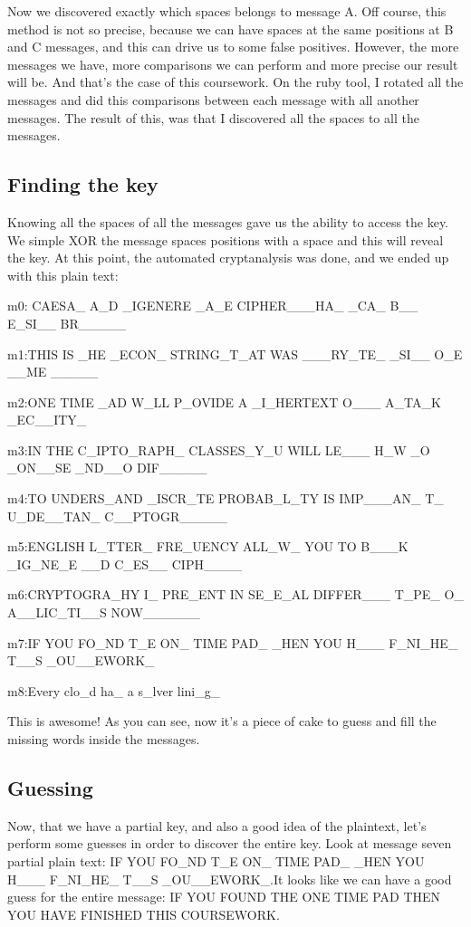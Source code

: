 \documentclass[journal]{IEEEtran}
\begin{document}
Now we discovered exactly which spaces belongs to message A. Off course, this method is not so precise, because we can have spaces at the same positions at B and C messages, and this can drive us to some false positives. However, the more messages we have, more comparisons we can perform and more precise our result will be. And that’s the case of this coursework. On the ruby tool, I rotated all the messages and did this comparisons between each message with all another messages. The result of this, was that I discovered all the spaces to all the messages.

\subsection{Finding the key}
Knowing all the spaces of all the messages gave us the ability to access the key. We simple XOR the message spaces positions with a space and this will reveal the key. At this point, the automated cryptanalysis was done, and we ended up with this plain text:

m0:    CAESA\_   A\_D   \_IGENERE  \_A\_E  CIPHER\_\_\_HA\_  \_CA\_ B\_\_  E\_SI\_\_   BR\_\_\_\_\_

m1:THIS  IS \_HE  \_ECON\_   STRING\_T\_AT  WAS  \_\_\_RY\_TE\_  \_SI\_\_  O\_E \_\_ME   \_\_\_\_\_

m2:ONE TIME \_AD W\_LL P\_OVIDE A  \_I\_HERTEXT O\_\_\_ A\_TA\_K \_EC\_\_ITY\_

m3:IN THE  C\_IPTO\_RAPH\_  CLASSES\_Y\_U WILL LE\_\_\_ H\_W \_O \_ON\_\_SE \_ND\_\_O DIF\_\_\_\_\_

m4:TO UNDERS\_AND \_ISCR\_TE PROBAB\_L\_TY IS IMP\_\_\_AN\_ T\_ U\_DE\_\_TAN\_ C\_\_PTOGR\_\_\_\_\_

m5:ENGLISH L\_TTER\_ FRE\_UENCY ALL\_W\_ YOU TO B\_\_\_K \_IG\_NE\_E \_\_D C\_ES\_\_ CIPH\_\_\_\_

m6:CRYPTOGRA\_HY I\_ PRE\_ENT IN SE\_E\_AL DIFFER\_\_\_ T\_PE\_ O\_ A\_\_LIC\_TI\_\_S NOW\_\_\_\_\_\_

m7:IF YOU FO\_ND T\_E ON\_ TIME PAD\_ \_HEN YOU H\_\_\_ F\_NI\_HE\_ T\_\_S  \_OU\_\_EWORK\_

m8:Every clo\_d ha\_ a s\_lver lini\_g\_

This is awesome! As you can see, now it’s a piece of cake to guess and fill the missing words inside the messages.

\subsection{Guessing}
Now, that we have a partial key, and also a good idea of the plaintext, let’s perform some guesses in order to discover the entire key. Look at message seven partial plain text: IF YOU FO\_ND T\_E ON\_ TIME PAD\_ \_HEN YOU H\_\_\_ F\_NI\_HE\_ T\_\_S  \_OU\_\_EWORK\_.It looks like we can have a good guess for the entire message: IF YOU FOUND THE ONE TIME PAD THEN YOU HAVE FINISHED THIS COURSEWORK.
\end{document}
